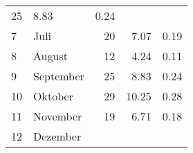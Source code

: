 \begin{longtable}{lXrrr}
       \num{25} &
       \num[round-mode=places,round-precision=2]{8,83} &
         \num[round-mode=places,round-precision=2]{0,24} \\

     7 &
     \multicolumn{1}{X}{ Juli   } &


       \num{20} &
       \num[round-mode=places,round-precision=2]{7,07} &
         \num[round-mode=places,round-precision=2]{0,19} \\

     8 &
     \multicolumn{1}{X}{ August   } &


       \num{12} &
       \num[round-mode=places,round-precision=2]{4,24} &
         \num[round-mode=places,round-precision=2]{0,11} \\

     9 &
     \multicolumn{1}{X}{ September   } &


       \num{25} &
       \num[round-mode=places,round-precision=2]{8,83} &
         \num[round-mode=places,round-precision=2]{0,24} \\

     10 &
     \multicolumn{1}{X}{ Oktober   } &


       \num{29} &
       \num[round-mode=places,round-precision=2]{10,25} &
         \num[round-mode=places,round-precision=2]{0,28} \\

     11 &
     \multicolumn{1}{X}{ November   } &


       \num{19} &
       \num[round-mode=places,round-precision=2]{6,71} &
         \num[round-mode=places,round-precision=2]{0,18} \\

     12 &
     \multicolumn{1}{X}{ Dezember   } &



\end{longtable}
